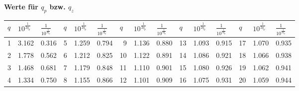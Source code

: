 \textbf{Werte für $q_p$ bzw. $q_z$}\\
\renewcommand{\arraystretch}{1.5}
\begin{tabular}{|r|r|r||r|r|r||r|r|r||r|r|r||r|r|r|}
\hline
\multicolumn{1}{|l|}{$q$} & \multicolumn{1}{l|}{$10^{\frac{1}{2 q_p}}$} & 
\multicolumn{1}{l||}{$\frac{1}{10^{\frac{1}{2 q_p}}}$} &
\multicolumn{1}{l|}{$q$} & \multicolumn{1}{l|}{$10^{\frac{1}{2 q_p}}$} &
\multicolumn{1}{l||}{$\frac{1}{10^{\frac{1}{2 q_p}}}$} &
\multicolumn{1}{l|}{$q$} & \multicolumn{1}{l|}{$10^{\frac{1}{2 q_p}}$} & \multicolumn{1}{l||}{$\frac{1}{10^{\frac{1}{2 q_p}}}$} & \multicolumn{1}{l|}{$q$} & \multicolumn{1}{l|}{$10^{\frac{1}{2 q_p}}$} & \multicolumn{1}{l||}{$\frac{1}{10^{\frac{1}{2 q_p}}}$} & \multicolumn{1}{l|}{$q$} & \multicolumn{1}{l|}{$10^{\frac{1}{2 q_p}}$} & \multicolumn{1}{l|}{$\frac{1}{10^{\frac{1}{2 q_p}}}$} \\ \hline
\hline
1 & 3.162 & 0.316 & 5 & 1.259 & 0.794 & 9 & 1.136 & 0.880 & 13 & 1.093 & 0.915 & 17 & 1.070 & 0.935 \\ \hline
2 & 1.778 & 0.562 & 6 & 1.212 & 0.825 & 10 & 1.122 & 0.891 & 14 & 1.086 & 0.921 & 18 & 1.066 & 0.938 \\ \hline
3 & 1.468 & 0.681 & 7 & 1.179 & 0.848 & 11 & 1.110 & 0.901 & 15 & 1.080 & 0.926 & 19 & 1.062 & 0.941 \\ \hline
4 & 1.334 & 0.750 & 8 & 1.155 & 0.866 & 12 & 1.101 & 0.909 & 16 & 1.075 & 0.931 & 20 & 1.059 & 0.944 \\ \hline
\end{tabular}
\renewcommand{\arraystretch}{1}

\newpage
